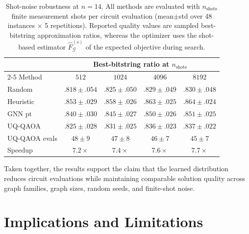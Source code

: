 \documentclass[aps,prx,reprint,superscriptaddress,longbibliography]{revtex4-2}
\newcommand{\GNN}{\textnormal{\textsc{GNN}}}
\newcommand{\UQQAOA}{\textnormal{\textsc{UQ-QAOA}}}
\newcommand{\calG}{\mathcal{G}}
\begin{document}
\begin{table}[t]
\caption{Shot-noise robustness at $n{=}14$. All methods are evaluated
with $n_{\mathrm{shots}}$ finite measurement shots per circuit
evaluation (mean$\pm$std over 48 instances $\times$ 5 repetitions).
Reported quality values are sampled best-bitstring approximation
ratios, whereas the optimizer uses the shot-based estimator
$\hat{F}^{(s)}_\calG$ of the expected objective during search.
\label{tab:shot_noise}}
\begin{ruledtabular}
\scriptsize
\begin{tabular*}{\columnwidth}{@{\extracolsep{\fill}}lcccc}
    & \multicolumn{4}{c}{Best-bitstring ratio at $n_{\mathrm{shots}}$} \\
    \cmidrule(lr){2-5}
    Method & $512$ & $1024$ & $4096$ & $8192$ \\
    \hline
    Random      & $.818\pm .054$
                & $.825\pm .050$
                & $.829\pm .049$
                & $.830\pm .048$ \\
    Heuristic   & $.853\pm .029$
                & $.858\pm .026$
                & $.863\pm .025$
                & $.864\pm .024$ \\
    \GNN{} pt   & $.840\pm .030$
                & $.845\pm .027$
                & $.850\pm .026$
                & $.851\pm .025$ \\
    \UQQAOA{}   & $.825\pm .028$
                & $.831\pm .025$
                & $.836\pm .023$
                & $.837\pm .022$ \\
    \hline
    \UQQAOA{} evals
                & $48\pm 9$
                & $47\pm 8$
                & $46\pm 7$
                & $45\pm 7$ \\
    Speedup     & $7.2\times$ & $7.4\times$
                & $7.6\times$ & $7.7\times$ \\
\end{tabular*}
\end{ruledtabular}
\end{table}

Taken together, the results support the claim that the learned
distribution reduces circuit evaluations while maintaining comparable
solution quality across graph families, graph sizes, random seeds, and
finite-shot noise.

\section{Implications and Limitations}
\label{sec:discussion}
\end{document}
